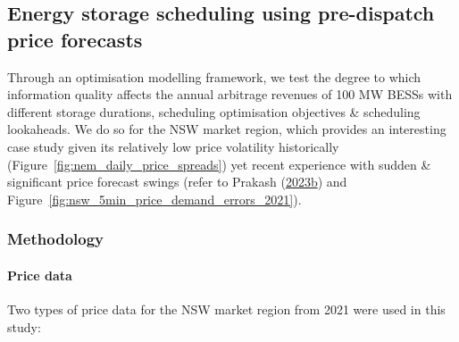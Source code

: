\documentclass[12pt,a4paper,]{report}
\begin{document}
\hypertarget{sec:info-case_study-bess_simulations}{%
\subsection{Energy storage scheduling using pre-dispatch price
forecasts}\label{sec:info-case_study-bess_simulations}}

Through an optimisation modelling framework, we test the degree to which
information quality affects the annual arbitrage revenues of 100 MW
BESSs with different storage durations, scheduling optimisation
objectives \& scheduling lookaheads. We do so for the NSW market region,
which provides an interesting case study given its relatively low price
volatility historically (Figure~\ref{fig:nem_daily_price_spreads}) yet
recent experience with sudden \& significant price forecast swings
(refer to Prakash
(\protect\hyperlink{ref-prakashEnergyPriceConvergence2023}{2023b}) and
Figure~\ref{fig:nsw_5min_price_demand_errors_2021}).

\hypertarget{sec:info-case_study-bess_simulations-method}{%
\subsubsection{Methodology}\label{sec:info-case_study-bess_simulations-method}}

\hypertarget{sec:info-case_study-bess_simulations-method-price_data}{%
\paragraph{Price
data}\label{sec:info-case_study-bess_simulations-method-price_data}}

Two types of price data for the NSW market region from 2021 were used in
this study:
\end{document}
